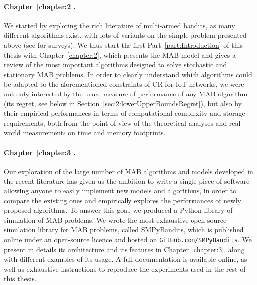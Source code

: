 \paragraph{Chapter~\ref{chapter:2}.}
%
We started by exploring the rich literature of multi-armed bandits,
as many different algorithms exist, with lots of variants on the simple problem presented above (see \cite{LattimoreBanditAlgorithmsBook,Slivkins2019} for surveys).
We thus start the first Part~\ref{part:Introduction} of this thesis with Chapter~\ref{chapter:2}, which presents the MAB model and gives a review of the most important algorithms designed to solve stochastic and stationary MAB problems.
%
In order to clearly understand which algorithms could be adapted to the aforementioned constraints of CR for IoT networks,
we were not only interested by the usual measure of performance of any MAB algorithm (its regret, see below in Section~\ref{sec:2:lowerUpperBoundsRegret}),
but also by their empirical performances in terms of computational complexity and storage requirements, both from the point of view of the theoretical analyses and real-world measurements on time and memory footprints.


\paragraph{Chapter~\ref{chapter:3}.}
%
Our exploration of the large number of MAB algorithms and models developed in the recent literature
has given us the ambition to write a single piece of software allowing anyone to easily implement new models and algorithms, in order to compare the existing ones and empirically explores the performances of newly proposed algorithms.
To answer this goal, we produced a Python library of simulation of MAB problems.
%
We wrote the most exhaustive open-source simulation library for MAB problems, called SMPyBandits, which is published online under an open-source licence \cite{SMPyBandits,SMPyBanditsJMLR} and hosted on \href{https://GitHub.com/SMPyBandits}{\texttt{GitHub.com/SMPyBandits}}.
We present in details its architecture and its features in Chapter~\ref{chapter:3}, along with different examples of its usage.
A full documentation is available online, as well as exhaustive instructions to reproduce the experiments used in the rest of this thesis.


